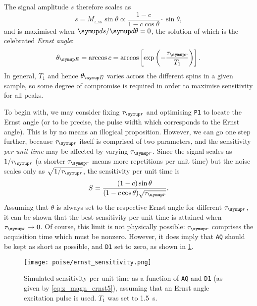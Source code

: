 The signal amplitude $s$ therefore scales as
\begin{equation}
    \label{eq:z_magn_ernst4}
    s = M_{z,\text{ss}}\sin\theta \propto \frac{1 - c}{1 - c\cos\theta} \cdot \sin\theta,
\end{equation}
and is maximised when $\md s/\md \theta = 0$, the solution of which is the celebrated \textit{Ernst angle}\autocite{Ernst1966RSI}:
\begin{equation}
    \label{eq:ernst_angle}
    \thetaE = \arccos{c} = \arccos\left[\exp\left(-\frac{\taur}{T_1}\right)\right].
\end{equation}
In general, $T_1$ and hence $\thetaE$ varies across the different spins in a given sample, so some degree of compromise is required in order to maximise sensitivity for all peaks.

To begin with, we may consider fixing $\taur$ and optimising \texttt{P1} to locate the Ernst angle (or to be precise, the pulse width which corresponds to the Ernst angle).
This is by no means an illogical proposition.
However, we can go one step further, because $\taur$ itself is comprised of two parameters, and the sensitivity \textit{per unit time} may be affected by varying $\taur$.
Since the signal scales as $1/\taur$ (a shorter $\taur$ means more repetitions per unit time) but the noise scales only as $\sqrt{1/\taur}$, the sensitivity per unit time is
\begin{equation}
    \label{eq:z_magn_ernst5}
    S = \frac{(1 - c)\sin\theta}{(1 - c\cos\theta)\sqrt{\taur}}.
\end{equation}
Assuming that $\theta$ is always set to the respective Ernst angle for different $\taur$, it can be shown that the best sensitivity per unit time is attained when $\taur \to 0$.\autocite{Waugh1970JMS,Traficante1992CMR}
Of course, this limit is not physically possible: $\taur$ comprises the acquisition time which must be nonzero.
However, it does imply that \texttt{AQ} should be kept as short as possible, and \texttt{D1} set to zero, as shown in \cref{fig:ernst_sensitivity}.

\begin{figure}[htb]
    \centering
    \texttt{[image: poise/ernst\_sensitivity.png]}%
    \caption[Sensitivity per unit time as a function of \texttt{AQ} and \texttt{D1}]{Simulated sensitivity per unit time as a function of \texttt{AQ} and \texttt{D1} (as given by \cref{eq:z_magn_ernst5}), assuming that an Ernst angle excitation pulse is used. $T_1$ was set to \qty{1.5}{\s}.}
    \label{fig:ernst_sensitivity}
\end{figure}



